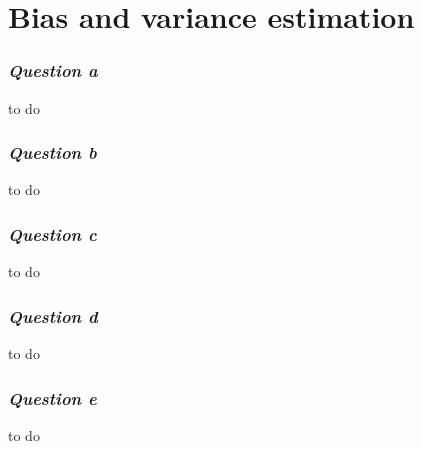 \section{Bias and variance estimation}

\subsubsection{{\it Question a}}
to do

\subsubsection{{\it Question b}}
to do

\subsubsection{{\it Question c}}
to do

\subsubsection{{\it Question d}}
to do

\subsubsection{{\it Question e}}
to do
